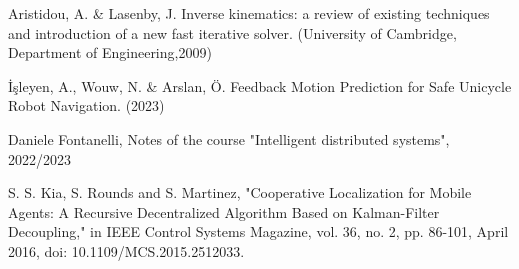 \begin{thebibliography}{00}
 Aristidou, A. \& Lasenby, J. Inverse kinematics: a review of existing techniques and introduction of a new fast iterative solver. (University of Cambridge, Department of Engineering,2009)

 İşleyen, A., Wouw, N. \& Arslan, Ö. Feedback Motion Prediction for Safe Unicycle Robot Navigation.  (2023)

 Daniele Fontanelli,
Notes of the course "Intelligent distributed systems",
2022/2023

 S. S. Kia, S. Rounds and S. Martinez, "Cooperative Localization for Mobile Agents: A Recursive Decentralized Algorithm Based on Kalman-Filter Decoupling," in IEEE Control Systems Magazine, vol. 36, no. 2, pp. 86-101, April 2016, doi: 10.1109/MCS.2015.2512033.
\end{thebibliography}
